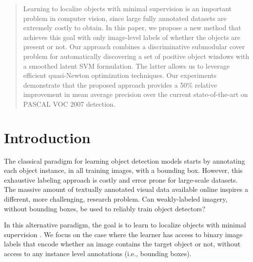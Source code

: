 \documentclass{article}
\begin{document}
 


\begin{abstract} 
Learning to localize objects with minimal supervision is an important problem in computer vision, since large fully annotated datasets are extremely costly to obtain. In this paper, we propose a new method that achieves this goal with only image-level labels of whether the objects are present or not. Our approach combines a discriminative submodular cover problem for automatically discovering a set of positive object windows with a smoothed latent SVM formulation.
The latter allows us to leverage efficient quasi-Newton optimization techniques. Our experiments demonstrate that the proposed approach provides a 50\% relative improvement in mean average precision over the current state-of-the-art on PASCAL VOC 2007 detection. 
\end{abstract} 

\section{Introduction}

The classical paradigm for learning object detection models starts by annotating each object instance, in all training images, with a bounding box. However, this exhaustive labeling approach is costly and error prone for large-scale datasets.
The massive amount of textually annotated visual data available online inspires a different, more challenging, research problem. Can weakly-labeled imagery, without bounding boxes, be used to reliably train object detectors? 

In this alternative paradigm, the goal is to learn to localize objects with minimal supervision \cite{perona1, perona2}. We focus on the case where the learner has access to binary image labels that encode whether an image contains the target object or not, without access to any instance level annotations (i.e., bounding boxes). 
\end{document}
